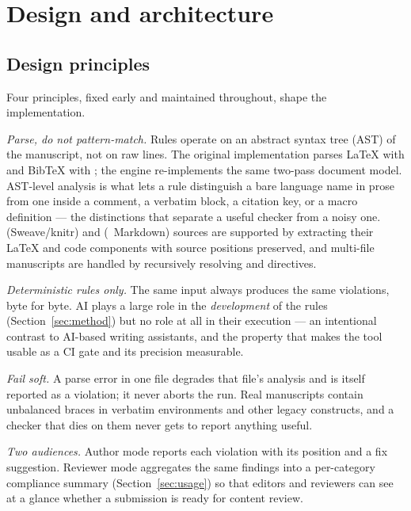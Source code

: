 \documentclass[nojss,article]{jss}
\providecommand{\BibTeX}{Bib\TeX{}}
\begin{document}
\section{Design and architecture}
\label{sec:design}

\subsection{Design principles}
\label{sec:principles}

Four principles, fixed early and maintained throughout, shape the
implementation.

\emph{Parse, do not pattern-match.} Rules operate on an abstract
syntax tree (AST) of the manuscript, not on raw lines. The original
 implementation parses \LaTeX{} with 
\citep{pylatexenc} and \BibTeX{} with 
\citep{bibtexparser}; the  engine re-implements the
same two-pass document model. AST-level analysis is what lets a rule
distinguish a bare language name in prose from one inside a comment,
a verbatim block, a citation key, or a macro definition --- the
distinctions that separate a useful checker from a noisy one.
 (Sweave/knitr) and  (~Markdown)
sources are supported by extracting their \LaTeX{} and code
components with source positions preserved, and multi-file
manuscripts are handled by recursively resolving
 and 
directives.

\emph{Deterministic rules only.} The same input always produces the
same violations, byte for byte. AI plays a large role in the
\emph{development} of the rules (Section~\ref{sec:method}) but no
role at all in their execution --- an intentional contrast to
AI-based writing assistants, and the property that makes the tool
usable as a CI gate and its precision measurable.

\emph{Fail soft.} A parse error in one file degrades that file's
analysis and is itself reported as a violation; it never aborts the
run. Real manuscripts contain unbalanced braces in verbatim
environments and other legacy constructs, and a checker that dies on
them never gets to report anything useful.

\emph{Two audiences.} Author mode reports each violation with its
position and a fix suggestion. Reviewer mode aggregates the same
findings into a per-category compliance summary
(Section~\ref{sec:usage}) so that editors and reviewers can see at a
glance whether a submission is ready for content review.
\end{document}
